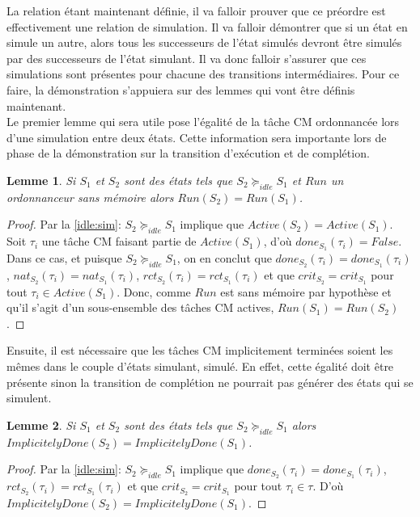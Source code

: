 \documentclass[12pt,a4paper,oneside]{book}
\theoremstyle{break}
\theoremstyle{breakplain}
\newtheorem{lem}{Lemme}[chapter]
\begin{document}
La relation étant maintenant définie, il va falloir prouver que ce préordre est effectivement une relation de simulation. Il va falloir démontrer que si un état en simule un autre, alors tous les successeurs de l'état simulés devront être simulés par des successeurs de l'état simulant. Il va donc falloir s'assurer que ces simulations sont présentes pour chacune des transitions intermédiaires. Pour ce faire, la démonstration s'appuiera sur des lemmes qui vont être définis maintenant.\\

Le premier lemme qui sera utile pose l'égalité de la tâche CM ordonnancée lors d'une simulation entre deux états. Cette information sera importante lors de phase de la démonstration sur la transition d'exécution et de complétion.

\pagebreak

\begin{lem}
\label{idle:runeq}
Si $S_1$ et $S_2$ sont des états tels que $S_2 \succeq_{idle}S_1$ et $Run$ un ordonnanceur sans mémoire alors $Run (S_2) = Run(S_1)$.
\end{lem}

\begin{proof} Par la \autoref{idle:sim}: $S_2 \succeq_{idle} S_1$ implique que $Active(S_2) = Active(S_1)$. Soit $\tau_i$ une tâche CM faisant partie de $Active(S_1)$, d'où $done_{S_1}(\tau_i) = False$. Dans ce cas, et puisque $S_2 \succeq_{idle} S_1$, on en conclut que $done_{S_2}(\tau_i) = done_{S_1}(\tau_i)$, $nat_{S_2}(\tau_i) = nat_{S_1}(\tau_i)$, $rct_{S_2}(\tau_i) = rct_{S_1}(\tau_i)$ et que $crit_{S_2} = crit_{S_1}$ pour tout $\tau_i \in Active(S_1)$. Donc, comme $Run$ est sans mémoire par hypothèse et qu'il s'agit d'un sous-ensemble des tâches CM actives, $Run(S_1) = Run(S_2)$.
\end{proof}

Ensuite, il est nécessaire que les tâches CM implicitement terminées soient les mêmes dans le couple d'états simulant, simulé. En effet, cette égalité doit être présente sinon la transition de complétion ne pourrait pas générer des états qui se simulent.\\

\begin{lem}
\label{idle:impdoneeq}
Si $S_1$ et $S_2$ sont des états tels que $S_2 \succeq_{idle} S_1$ alors $ImplicitelyDone(S_2) = ImplicitelyDone(S_1)$.
\end{lem}

\begin{proof} Par la \autoref{idle:sim}: $S_2 \succeq_{idle} S_1$ implique que $done_{S_2}(\tau_i) = done_{S_1}(\tau_i)$, $rct_{S_2}(\tau_i) = rct_{S_1}(\tau_i)$ et que $crit_{S_2} = crit_{S_1}$ pour tout $\tau_i \in \tau$. D'où $ImplicitelyDone(S_2) = ImplicitelyDone(S_1)$.
\end{proof}
\end{document}
